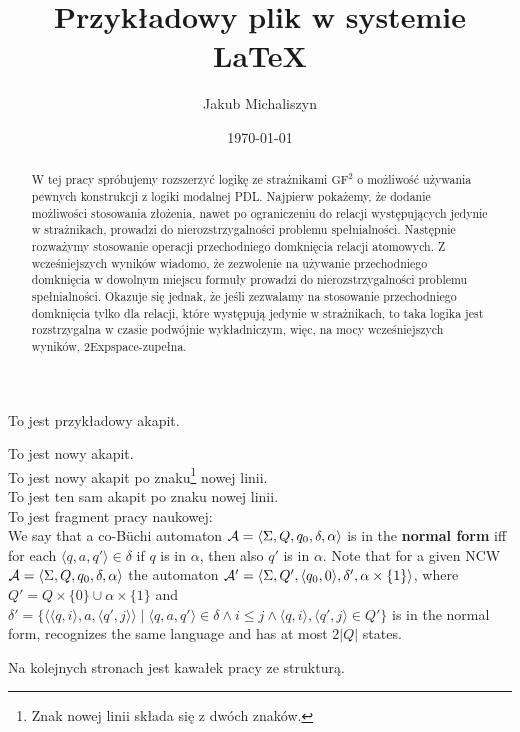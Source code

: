 \documentclass[a4paper]{article}
\author{Jakub Michaliszyn}
\title{Przykładowy plik w systemie \LaTeX}
\date{\today}
\begin{document}
\maketitle
To jest przykładowy akapit.

To jest nowy akapit.\\

To jest nowy akapit po znaku\footnote{Znak nowej linii składa się z dwóch znaków.} nowej linii.\\
To jest ten sam akapit po znaku nowej linii.\\

To jest fragment pracy naukowej:\\

We say that a co-B\"uchi automaton ${\cal{A}}=\langle \Sigma , Q, q_0, \delta , \alpha\rangle$ is in the {\bf normal form} iff for each $\langle q, a, q'\rangle \in \delta$ if $q$ is in $\alpha$, then also $q'$ is in $\alpha$. Note that for a given NCW 
${\cal{A}}=\langle \Sigma, Q, q_0, \delta , \alpha\rangle$
the automaton ${\cal{A'}}=\langle \Sigma, Q', \langle q_0, 0\rangle, \delta', \alpha\times\{1\}\rangle$, where 
$Q'=Q\times\{0\} \cup \alpha \times \{1\}$ and 
$\delta'=\{\langle \langle q, i\rangle, a, \langle q', j \rangle\rangle \; | \; \langle q, a, q'\rangle \in \delta \wedge i \leq j 
\wedge  \langle q, i\rangle,\langle q', j \rangle\in Q' \}$ 
is in the normal form, recognizes the same language and has at most $2|Q|$ states.
 
 
 Na kolejnych stronach jest kawałek pracy ze strukturą.
\newpage
 
 \begin{abstract}
 W tej pracy spróbujemy rozszerzyć logikę ze strażnikami $\mathrm{GF^2}$ o możliwość używania pewnych konstrukcji z logiki modalnej PDL. Najpierw pokażemy, że dodanie możliwości stosowania złożenia, nawet po ograniczeniu do relacji występujących jedynie w strażnikach, prowadzi do nierozstrzygalności problemu spełnialności. Następnie rozważymy stosowanie operacji przechodniego domknięcia relacji atomowych. Z wcześniejszych wyników wiadomo, że zezwolenie na używanie przechodniego domknięcia w dowolnym miejscu formuły prowadzi do nierozstrzygalności problemu spełnialności. Okazuje się jednak, że jeśli zezwalamy na stosowanie przechodniego domknięcia tylko dla relacji, które występują jedynie w strażnikach, to taka logika jest rozstrzygalna w czasie podwójnie wykładniczym, więc, na mocy wcześniejszych wyników, {\sc 2Expspace}-zupełna.


\end{abstract}
\end{document}
